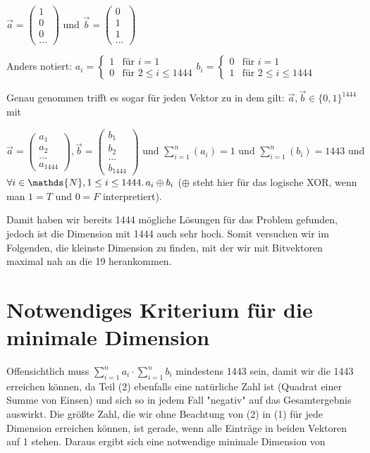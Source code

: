 \documentclass{article}
\newcommand{\sumN}[2]{\ensuremath{\sum\limits_{#1}^{#2}}}
\newcommand{\inN}[1]{\ensuremath{#1 \in \mathds{N}}}
\newcommand{\faExp}[2]{\ensuremath{\forall #1 \ldotp #2}}
\begin{document}
$\vec a = \begin{pmatrix}1\\0\\0\\...\end{pmatrix}$ und $\vec b = \begin{pmatrix}0\\1\\1\\...\end{pmatrix}$

Anders notiert:
$a_i = 
\begin{cases}
1 & \text{für } i=1 \\
0 & \text{für } 2 \leq i \leq 1444
\end{cases}
b_i = 
\begin{cases}
0 & \text{für } i=1 \\
1 & \text{für } 2 \leq i \leq 1444
\end{cases}
$

Genau genommen trifft es sogar für jeden Vektor zu in dem gilt: $\vec a,\vec b \in \{0,1\}^{1444}$ mit

$\vec a = \begin{pmatrix}a_1\\a_2\\...\\a_{1444}\end{pmatrix}, \vec b = \begin{pmatrix}b_1\\b_2\\...\\b_{1444}\end{pmatrix} \text{ und } \sumN{i=1}{n}(a_i) = 1 \text{ und } \sumN{i=1}{n}(b_i) = 1443 \text{ und }$\\ $\faExp{\inN{i}, 1\leq i \leq 1444}{a_i \oplus b_i}$ ($\oplus$ steht hier für das logische XOR, wenn man $1=T$ und $0=F$ interpretiert).

Damit haben wir bereits 1444 mögliche Lösungen für das Problem gefunden, jedoch ist die Dimension mit 1444 auch sehr hoch. Somit versuchen wir im Folgenden, die kleinste Dimension zu finden, mit der wir mit Bitvektoren maximal nah an die 19 herankommen.

\section{Notwendiges Kriterium für die minimale Dimension}

Offensichtlich muss $\sumN{i=1}{n}a_i \cdot \sumN{i=1}{n}b_i$ mindestens 1443 sein, damit wir die 1443 erreichen können, da Teil (2) ebenfalls eine natürliche Zahl ist (Quadrat einer Summe von Einsen) und sich so in jedem Fall "negativ" auf das Gesamtergebnis auswirkt. Die größte Zahl, die wir ohne Beachtung von (2) in (1) für jede Dimension erreichen können, ist gerade, wenn alle Einträge in beiden Vektoren auf 1 stehen. Daraus ergibt sich eine notwendige minimale Dimension von
\end{document}
